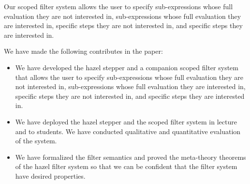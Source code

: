 
Our scoped filter system allows the user to specify sub-expressions whose full
evaluation they are not interested in, sub-expressions whose full evaluation
they are interested in, specific steps they are not interested in, and specific
steps they are interested in.



We have made the following contributes in the paper:
\begin{itemize}
  \item We have developed the hazel stepper and a companion scoped filter system
    that allows the user to specify sub-expressions whose full evaluation they
    are not interested in, sub-expressions whose full evaluation they are
    interested in, specific steps they are not interested in, and specific steps
    they are interested in.
  \item We have deployed the hazel stepper and the scoped filter system in
    lecture and to students. We have conducted qualitative and quantitative
    evaluation of the system.
  \item We have formalized the filter semantics and proved the meta-theory
    theorems of the hazel filter system so that we can be confident that the
    filter system have desired properties.
\end{itemize}

